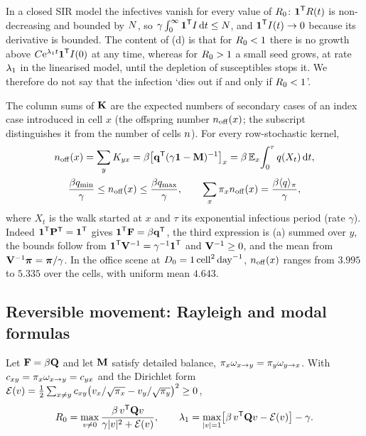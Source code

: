 \begin{remark}
  In a closed SIR model the infectives vanish for every value of $R_0$: $\boldsymbol{1}^{\mathsf{T}}R(t)$ is non-decreasing and
  bounded by $N$, so $\gamma\int_0^\infty\boldsymbol{1}^{\mathsf{T}}I\,\mathrm{d} t\le N$, and $\boldsymbol{1}^{\mathsf{T}}I(t)\to0$ because its
  derivative is bounded.  The content of (d) is that for $R_0<1$ there is no growth above
  $C\mathrm{e}^{\lambda_1 t}\boldsymbol{1}^{\mathsf{T}}I(0)$ at any time, whereas for $R_0>1$ a small seed grows, at rate $\lambda_1$ in the
  linearised model, until the depletion of susceptibles stops it.  We therefore do not say that the infection
  `dies out if and only if $R_0<1$'.
\end{remark}

\begin{remark}
  The column sums of $\mathbf{K}$ are the expected numbers of secondary cases of an index case introduced in cell
  $x$ (the offspring number $n_{\mathrm{off}}(x)$; the subscript distinguishes it from the number of cells $n$).
  For every row-stochastic kernel,
  \begin{equation}\label{s3_r0:eq:offspringdetail}
  \begin{gathered}
    n_{\mathrm{off}}(x)=\sum_yK_{yx}=\beta\bigl[\mathbf{q}^{\mathsf{T}}(\gamma\mathbf{1}-\mathbf{M})^{-1}\bigr]_x=\beta\,\mathbb{E}_x\!\int_0^{\tau}q(X_t)\,\mathrm{d} t ,\\
    \frac{\beta q_{\min}}{\gamma}\le n_{\mathrm{off}}(x)\le\frac{\beta q_{\max}}{\gamma},\qquad \sum_x\pi_xn_{\mathrm{off}}(x)=\frac{\beta\langle q\rangle_{\pi}}{\gamma},
  \end{gathered}
  \end{equation}
  where $X_t$ is the walk started at $x$ and $\tau$ its exponential infectious period (rate $\gamma$).
  Indeed $\boldsymbol{1}^{\mathsf{T}}\mathbf{P}^{\mathsf{T}}=\boldsymbol{1}^{\mathsf{T}}$ gives $\boldsymbol{1}^{\mathsf{T}}\mathbf{F}=\beta\mathbf{q}^{\mathsf{T}}$, the third expression is (a)
  summed over $y$, the bounds follow from $\boldsymbol{1}^{\mathsf{T}}\mathbf{V}^{-1}=\gamma^{-1}\boldsymbol{1}^{\mathsf{T}}$ and $\mathbf{V}^{-1}\ge0$, and the
  mean from $\mathbf{V}^{-1}\boldsymbol{\pi}=\boldsymbol{\pi}/\gamma$.  In the office scene at $D_0=1\,\mathrm{cell}^2\,\mathrm{day}^{-1}$, $n_{\mathrm{off}}(x)$ ranges from $3.995$
  to $5.335$ over the cells, with uniform mean $4.643$.
\end{remark}

\subsection{Reversible movement: Rayleigh and modal formulas}

\begin{theorem}\label{s3_r0:thm:rayleigh}
  Let $\mathbf{F}=\beta\mathbf{Q}$ and let $\mathbf{M}$ satisfy detailed balance, $\pi_x\omega_{x\to y}=\pi_y\omega_{y\to x}$.  With
  $c_{xy}=\pi_x\omega_{x\to y}=c_{yx}$ and the Dirichlet form
  $\mathcal{E}(v)=\tfrac12\sum_{x\ne y}c_{xy}\bigl(v_x/\sqrt{\pi_x}-v_y/\sqrt{\pi_y}\bigr)^2\ge0$,
  \begin{equation}\label{s3_r0:eq:rayleigh}
    R_0=\max_{v\neq0}\frac{\beta\,v^{\mathsf{T}}\mathbf{Q} v}{\gamma|v|^2+\mathcal{E}(v)},\qquad
    \lambda_1=\max_{|v|=1}\bigl[\beta\,v^{\mathsf{T}}\mathbf{Q} v-\mathcal{E}(v)\bigr]-\gamma .
  \end{equation}
\end{theorem}

